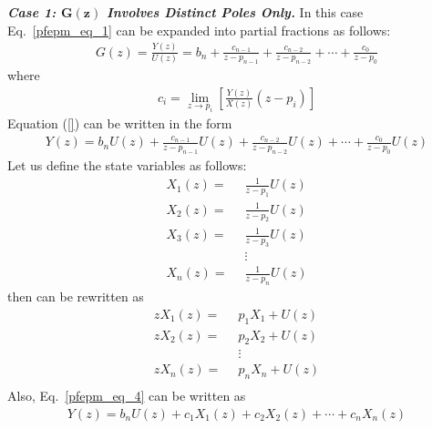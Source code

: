 \documentclass[11pt,a4paper,oneside]{book}
\numberwithin{equation}{section}
\theoremstyle{it}
\theoremstyle{definition}
\begin{document}
\vspace{5mm}
\noindent\textbf{\textit{Case 1: $\mathbf{G(z)}$ Involves Distinct Poles Only.}} In this case Eq.~\eqref{pfepm_eq_1} can be expanded into partial fractions as follows:
\begin{equation}\label{pfepm_eq_2}
	\begin{aligned}
		G(z)=\frac{Y(z)}{U(z)} = b_n + \frac{c_{n-1}}{z-p_{n-1}}+\frac{c_{n-2}}{z-p_{n-2}}+\cdots+\frac{c_0}{z-p_0}
	\end{aligned}
\end{equation}
where
\begin{equation}\label{pfepm_eq_3}
	\begin{aligned}
		c_i = \lim_{z \to p_i} \left[\frac{Y(z)}{X(z)}(z-p_i)\right]
	\end{aligned}
\end{equation}
Equation (\ref{}) can be written in the form 
\begin{equation}\label{pfepm_eq_4}
	\begin{aligned}
		Y(z)= b_n U(z) + \frac{c_{n-1}}{z-p_{n-1}}U(z)+\frac{c_{n-2}}{z-p_{n-2}}U(z)+\cdots+\frac{c_0}{z-p_0}U(z)
	\end{aligned}
\end{equation}
Let us define the state variables as follows:
\begin{equation}\label{pfepm_eq_5}
	\begin{aligned}
		X_1(z)= & \enspace  \frac{1}{z-p_1}U(z) \\[6pt]
		X_2(z)= & \enspace  \frac{1}{z-p_2}U(z) \\[6pt]
		X_3(z)= & \enspace  \frac{1}{z-p_3}U(z) \\[6pt]
		& \enspace \vdots \\[6pt]
		X_n(z)= & \enspace  \frac{1}{z-p_n}U(z) 
	\end{aligned}
\end{equation}
then can be rewritten as
\begin{equation}\label{pfepm_eq_6}
	\begin{aligned}
		zX_1(z)= & \enspace  p_1X_1+U(z) \\[6pt]
		zX_2(z)= & \enspace  p_2X_2+U(z) \\[6pt]
		& \enspace \vdots \\[6pt]
		zX_n(z)= & \enspace  p_nX_n+U(z) \\[6pt]
	\end{aligned}
\end{equation}
Also, Eq.~\eqref{pfepm_eq_4} can be written as
\begin{equation}\label{pfepm_eq_7}
	\begin{aligned}
		Y(z)= b_n U(z) + c_1X_1(z)+ c_2X_2(z)+ \cdots +c_nX_n(z)
	\end{aligned}
\end{equation}
\end{document}
